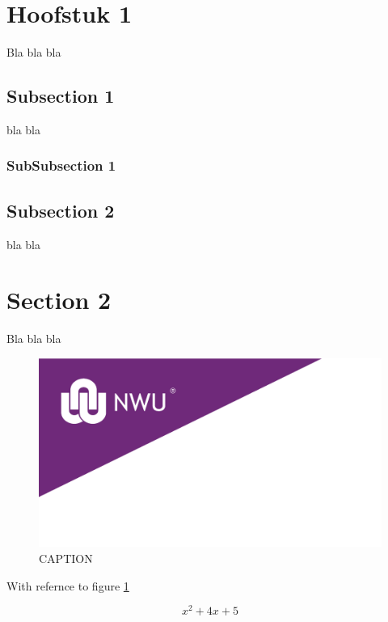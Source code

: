 \documentclass[a4paper, 11pt]{article} %
\begin{document}
\listoffigures

\listoftables

\pagebreak


\section{Hoofstuk 1}
Bla bla bla 
\subsection{Subsection 1}
bla bla
\subsubsection{SubSubsection 1}

\subsection{Subsection 2}
bla bla

\section{Section 2}
Bla bla bla \cite{CountdownTimer}


\begin{figure}[h]
\center
\includegraphics[scale=0.5]{NWU_Purple_Cover.png}
\textcolor{Puk_Pers}{\caption{CAPTION}}
\label{LABEL_NAME}
\end{figure}

With refernce to figure \ref{LABEL_NAME} 


\begin{equation} 
x^2 + 4x + 5 
\label{EQUATION NAME}
\end{equation}
\end{document}
